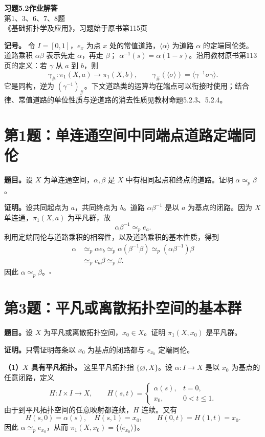 \documentclass[UTF8,11pt,a4paper]{ctexart}
\newcommand{\pc}[1]{\langle #1\rangle}
\newcommand{\pe}{\simeq_p}
\newcommand{\pf}{\par\noindent\textbf{证明。}}
\newcommand{\done}{\hfill\(\square\)\par}
\begin{document}
\begin{center}
{\LARGE\bfseries 习题5.2\quad 作业解答}\\[7pt]
{\large 第1、3、6、7、8题}\\[4pt]
{\small 《基础拓扑学及应用》，习题始于原书第115页}
\end{center}

\noindent\textbf{记号。}
令 \(I=[0,1]\)，\(e_x\) 为点 \(x\) 处的常值道路，\(\pc{\alpha}\) 为道路 \(\alpha\) 的定端同伦类。
道路乘积 \(\alpha\beta\) 表示先走 \(\alpha\)，再走 \(\beta\)；
\(\alpha^{-1}(s)=\alpha(1-s)\)。沿用教材原书第113页的定义：若 \(\gamma\) 从 \(a\) 到 \(b\)，则
\[
 \gamma_\#: \pi_1(X,a)\longrightarrow\pi_1(X,b),
 \qquad \gamma_\#(\pc{\sigma})=\pc{\gamma^{-1}\sigma\gamma}.
\]
它是同构，逆为 \((\gamma^{-1})_\#\)。下文道路类的运算均在端点可以衔接时使用；结合律、常值道路的单位性质与逆道路的消去性质见教材命题5.2.3、5.2.4。

\section*{第1题：单连通空间中同端点道路定端同伦}
\textbf{题目。}设 \(X\) 为单连通空间，\(\alpha,\beta\) 是 \(X\) 中有相同起点和终点的道路。证明 \(\alpha\pe\beta\)。

\pf 设共同起点为 \(a\)，共同终点为 \(b\)。道路 \(\alpha\beta^{-1}\) 是以 \(a\) 为基点的闭路。因为 \(X\) 单连通，\(\pi_1(X,a)\) 为平凡群，故
\[
 \alpha\beta^{-1}\pe e_a.
\]
利用定端同伦与道路乘积的相容性，以及道路乘积的基本性质，得到
\[
 \begin{aligned}
 \alpha
 &\pe \alpha e_b
 \pe \alpha(\beta^{-1}\beta)
 \pe (\alpha\beta^{-1})\beta\\
 &\pe e_a\beta
 \pe \beta.
 \end{aligned}
\]
因此 \(\alpha\pe\beta\)。\done

\section*{第3题：平凡或离散拓扑空间的基本群}
\textbf{题目。}设 \(X\) 为平凡或离散拓扑空间，\(x_0\in X\)。证明 \(\pi_1(X,x_0)\) 是平凡群。

\pf 只需证明每条以 \(x_0\) 为基点的闭路都与 \(e_{x_0}\) 定端同伦。

\textbf{（1）\(X\) 具有平凡拓扑。}
这里平凡拓扑指 \(\{\varnothing,X\}\)。设 \(\alpha:I\to X\) 是以 \(x_0\) 为基点的任意闭路，定义
\[
 H:I\times I\to X,\qquad
 H(s,t)=
 \begin{cases}
 \alpha(s),&t=0,\\
 x_0,&0<t\leq1.
 \end{cases}
\]
由于到平凡拓扑空间的任意映射都连续，\(H\) 连续。又有
\[
 H(s,0)=\alpha(s),\quad H(s,1)=x_0,
 \qquad H(0,t)=H(1,t)=x_0.
\]
因此 \(\alpha\pe e_{x_0}\)，从而 \(\pi_1(X,x_0)=\{\pc{e_{x_0}}\}\)。
\end{document}
